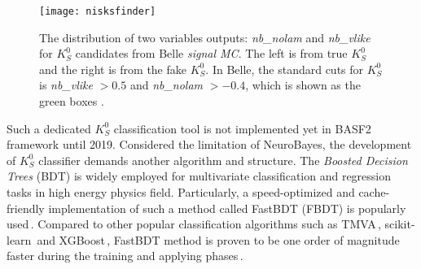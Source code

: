 \begin{figure}[htpb]
	\centering 
	\texttt{[image: nisksfinder]}
	\caption{The distribution of two variables outputs: \textit{nb\_nolam} and \textit{nb\_vlike} for $K_S^0$ candidates from Belle \textit{signal MC}. The left is from true $K_S^0$ and the right is from the fake $K_S^0$. In Belle, the standard cuts for $K_S^0$ is \textit{nb\_vlike} $> 0.5$ and \textit{nb\_nolam} $> -0.4$, which is shown as the green boxes \cite{kang2020measurement}.}
	\label{b1niskf}
\end{figure}


Such a dedicated $K_S^0$ classification tool is not implemented yet in BASF2 framework until 2019. Considered the limitation of NeuroBayes, the development of $K_S^0$ classifier demands another algorithm and structure. The \textit{Boosted Decision Trees} (BDT) is widely employed for multivariate classification and regression tasks in high energy physics field. Particularly, a speed-optimized and cache-friendly
implementation of such a method called FastBDT (FBDT) is popularly used\,\cite{keck2016fastbdt}. Compared to other popular classification algorithms such as TMVA\,\cite{therhaag2012tmva}, scikit-learn\,\cite{pedregosa2011scikit} and XGBoost\,\cite{chen2016xgboost}, FastBDT method is proven to be one order of magnitude faster during the training and applying phases\,\cite{keck2016fastbdt}. 
